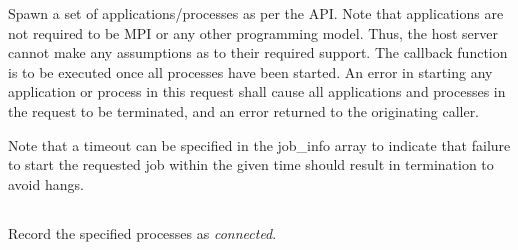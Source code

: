 
\optattrend

\descr

Spawn a set of applications/processes as per the  API.
Note that applications are not required to be \ac{MPI} or any other programming model.
Thus, the host server cannot make any assumptions as to their required support.
The callback function is to be executed once all processes have been started.
An error in starting any application or process in this request shall cause all applications and processes in the request to be terminated, and an error returned to the originating caller.

Note that a timeout can be specified in the job_info array to indicate that failure to start the requested job within the given time should result in termination to avoid hangs.


\subsection{}

\summary

Record the specified processes as \textit{connected}.


